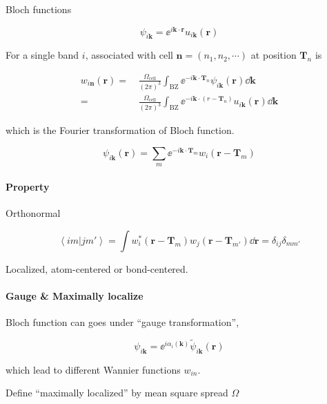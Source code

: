 \documentclass[12pt,a4paper]{article}
\begin{document}
    Bloch functions

    \[ \psi_{i\mathbf{k}} = \ee^{i\mathbf{k}\cdot \mathbf{r}} u_{i\mathbf{k}}(\mathbf{r})\]

    For a single band $i$,  associated with cell $\mathbf{n} = (n_1, n_2, \cdots)$ at position $\mathbf{T}_n$ is

    \begin{equation}
    \label{eq:Wannier}
    \begin{aligned}
        w_{i\mathbf{n}}(\mathbf{r})
        = &\, \frac{\Omega_{\text{cell}}}{(2\pi)^3}
        \int_{\text{BZ}} \ee^{-i\mathbf{k}\cdot \mathbf{T}_n} \psi_{i\mathbf{k}}(\mathbf{r}) \dd \mathbf{\mathbf{k}} \\
        = &\, \frac{\Omega_{\text{cell}}}{(2\pi)^3}
        \int_{\text{BZ}} \ee^{-i\mathbf{k}\cdot (r-\mathbf{T}_n)} u_{i\mathbf{k}}(\mathbf{r}) \dd \mathbf{\mathbf{k}}
    \end{aligned}
    \end{equation}

    which is the Fourier transformation of Bloch function.

    \[ \psi_{i\mathbf{k}}(\mathbf{r})
    = \sum_m \ee^{-i\mathbf{k}\cdot \mathbf{T}_m} w_i(\mathbf{r} - \mathbf{T}_m) \]

\paragraph{Property}

    Orthonormal

    \[ \left\langle im | jm' \right\rangle
    = \int w_i^*(\mathbf{r}-\mathbf{T}_m) w_j(\mathbf{r}-\mathbf{T}_{m'}) \dd \mathbf{r}
    = \delta_{ij} \delta_{mm'} \]

    Localized, atom-centered or bond-centered.

\paragraph{Gauge \& Maximally localize}

    Bloch function can goes under ``gauge transformation'',

    \[ \psi_{i\mathbf{k}} = \ee^{i\alpha_i(\mathbf{k})} \tilde{\psi}_{i\mathbf{k}}(\mathbf{r}) \]

    which lead to different Wannier functions $w_{in}$.

    Define ``maximally localized'' by mean square spread $\Omega$
\end{document}
